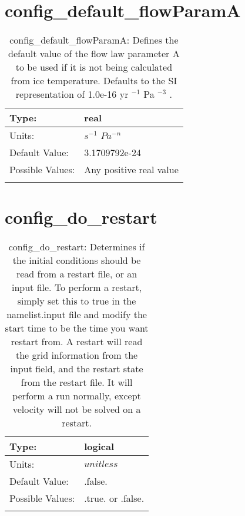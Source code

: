 \section[config\_default\_flowParamA]{config\_default\_flowParamA}
\label{sec:nm_sec_config_default_flowParamA}
\begin{center}
\begin{longtable}{| p{2.0in} || p{4.0in} |}
    \hline
    Type: & real \\
    \hline
    Units: & $s^{-1}$ $Pa^{-n}$ \\
    \hline
    Default Value: & 3.1709792e-24 \\
    \hline
    Possible Values: & Any positive real value \\
    \hline
    \caption{config\_default\_flowParamA:  Defines the default value of the flow law parameter A to be used if it is not being calculated from ice temperature.  Defaults to the SI representation of 1.0e-16 yr $^{-1}$  Pa $^{-3}$ .}
\end{longtable}
\end{center}
\section[config\_do\_restart]{config\_do\_restart}
\label{sec:nm_sec_config_do_restart}
\begin{center}
\begin{longtable}{| p{2.0in} || p{4.0in} |}
    \hline
    Type: & logical \\
    \hline
    Units: & $unitless$ \\
    \hline
    Default Value: & .false. \\
    \hline
    Possible Values: & .true. or .false. \\
    \hline
    \caption{config\_do\_restart: Determines if the initial conditions should be read from a restart file, or an input file.  To perform a restart, simply set this to true in the namelist.input file and modify the start time to be the time you want restart from.  A restart will read the grid information from the input field, and the restart state from the restart file.  It will perform a run normally, except velocity will not be solved on a restart.}
\end{longtable}
\end{center}
